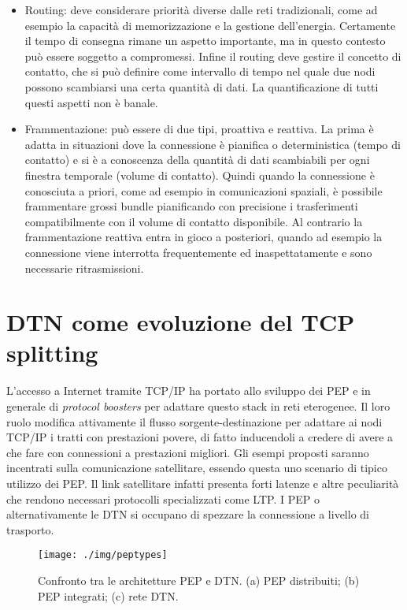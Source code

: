 \documentclass[12pt,a4paper,oneside]{book}
\begin{document}
\begin{itemize}
			\item Routing: deve considerare priorità diverse dalle reti tradizionali, come ad esempio la capacità di memorizzazione e la gestione dell'energia. Certamente il tempo di consegna rimane un aspetto importante, ma in questo contesto può essere soggetto a compromessi. Infine il routing deve gestire il concetto di contatto, che si può definire come intervallo di tempo nel quale due nodi possono scambiarsi una certa quantità di dati. La  quantificazione di tutti questi aspetti non è banale.
			
			\item Frammentazione: può essere di due tipi, proattiva e reattiva. La prima è adatta in situazioni dove la connessione è pianifica o deterministica (tempo di contatto) e si è a conoscenza della quantità di dati scambiabili per ogni finestra temporale (volume di contatto). Quindi quando la connessione è conosciuta a priori, come ad esempio in comunicazioni spaziali, è possibile frammentare grossi bundle pianificando con precisione i trasferimenti compatibilmente con il volume di contatto disponibile.
			Al contrario la frammentazione reattiva entra in gioco a posteriori, quando ad esempio la connessione viene interrotta frequentemente ed inaspettatamente e sono necessarie ritrasmissioni.
			
		\end{itemize}
		
		
		\section{DTN come evoluzione del TCP splitting}
		L'accesso a Internet tramite TCP/IP ha portato allo sviluppo dei PEP e in generale di {\it protocol boosters } per adattare questo stack in reti eterogenee. Il loro ruolo modifica attivamente il flusso sorgente-destinazione per adattare ai nodi TCP/IP i tratti con prestazioni povere, di fatto inducendoli a credere di avere a che fare con connessioni a prestazioni migliori. Gli esempi proposti saranno incentrati sulla comunicazione satellitare, essendo questa uno scenario di tipico utilizzo dei PEP. Il link satellitare infatti presenta forti latenze e altre peculiarità che rendono necessari protocolli specializzati come LTP. I PEP o alternativamente le DTN si occupano di spezzare la connessione a livello di trasporto.
		\begin{figure}[h]
			\centering
			\texttt{[image: ./img/peptypes]}
			\caption{Confronto tra le architetture PEP e DTN. (a) PEP distribuiti; (b) PEP integrati; (c) rete DTN.}
			\label{fig:pep}
		\end{figure}		
		
\end{document}
